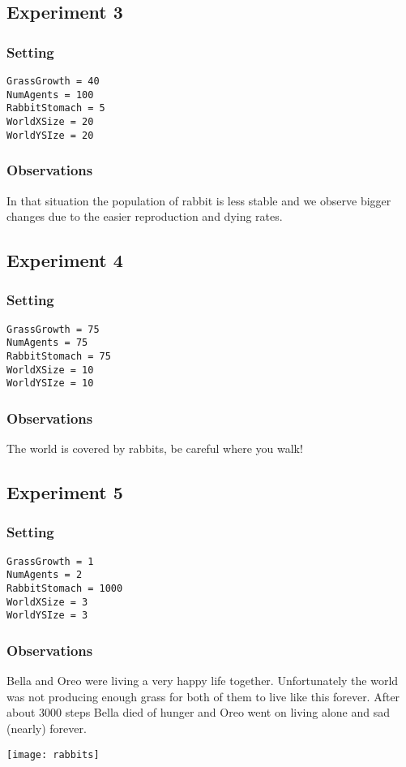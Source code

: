 \documentclass[11pt]{article}
\begin{document}
\subsection{Experiment 3}
\subsubsection{Setting}
\begin{verbatim}
GrassGrowth = 40
NumAgents = 100
RabbitStomach = 5
WorldXSize = 20
WorldYSIze = 20
\end{verbatim}
\subsubsection{Observations}
In that situation the population of rabbit is less stable and we observe bigger changes due to the easier reproduction and dying rates.

\subsection{Experiment 4}
\subsubsection{Setting}
\begin{verbatim}
GrassGrowth = 75
NumAgents = 75
RabbitStomach = 75
WorldXSize = 10
WorldYSIze = 10
\end{verbatim}
\subsubsection{Observations}
The world is covered by rabbits, be careful where you walk!

\subsection{Experiment 5}
\subsubsection{Setting}
\begin{verbatim}
GrassGrowth = 1
NumAgents = 2
RabbitStomach = 1000
WorldXSize = 3
WorldYSIze = 3
\end{verbatim}
\subsubsection{Observations}
Bella and Oreo were living a very happy life together. Unfortunately the world was not producing enough grass for both of them to live like this forever. After about 3000 steps Bella died of hunger and Oreo went on living alone and sad (nearly) forever.

\vfill
\center
\texttt{[image: rabbits]}
\vfill
\end{document}
